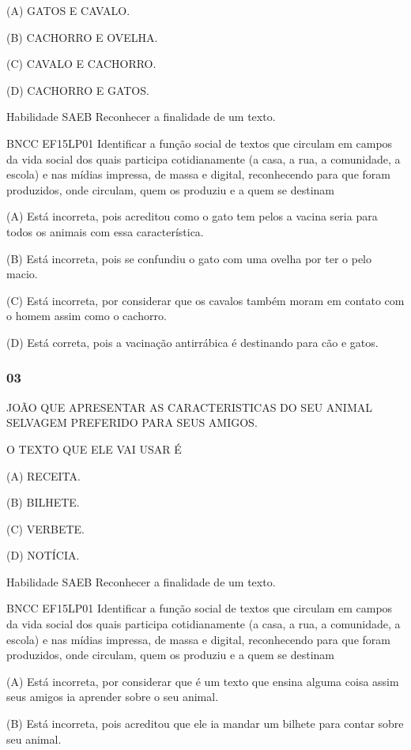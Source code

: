 (A) GATOS E CAVALO.

(B) CACHORRO E OVELHA.

(C) CAVALO E CACHORRO.

(D) CACHORRO E GATOS.

\protect\hypertarget{_Hlk128891305}{}{}Habilidade SAEB Reconhecer a
finalidade de um texto.

BNCC EF15LP01 Identificar a função social de textos que circulam em
campos da vida social dos quais participa cotidianamente (a casa, a rua,
a comunidade, a escola) e nas mídias impressa, de massa e digital,
reconhecendo para que foram produzidos, onde circulam, quem os produziu
e a quem se destinam

(A) Está incorreta, pois acreditou como o gato tem pelos a vacina seria
para todos os animais com essa característica.

(B) Está incorreta, pois se confundiu o gato com uma ovelha por ter o
pelo macio.

(C) Está incorreta, por considerar que os cavalos também moram em
contato com o homem assim como o cachorro.

(D) Está correta, pois a vacinação antirrábica é destinando para cão e
gatos.

\subsubsection{03}\label{section-54}

JOÃO QUE APRESENTAR AS CARACTERISTICAS DO SEU ANIMAL SELVAGEM PREFERIDO
PARA SEUS AMIGOS.

O TEXTO QUE ELE VAI USAR É

(A) RECEITA.

(B) BILHETE.

(C) VERBETE.

(D) NOTÍCIA.

Habilidade SAEB Reconhecer a finalidade de um texto.

BNCC EF15LP01 Identificar a função social de textos que circulam em
campos da vida social dos quais participa cotidianamente (a casa, a rua,
a comunidade, a escola) e nas mídias impressa, de massa e digital,
reconhecendo para que foram produzidos, onde circulam, quem os produziu
e a quem se destinam

(A) Está incorreta, por considerar que é um texto que ensina alguma
coisa assim seus amigos ia aprender sobre o seu animal.

(B) Está incorreta, pois acreditou que ele ia mandar um bilhete para
contar sobre seu animal.

